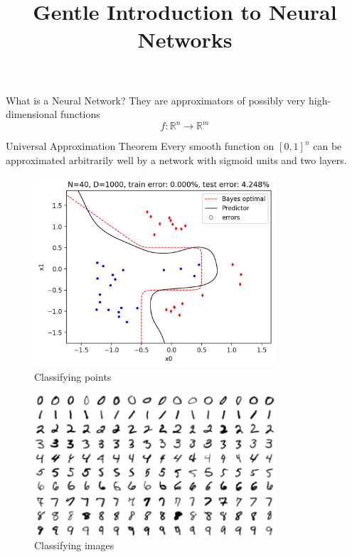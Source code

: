 \documentclass{beamer}
\title[Neural Networks]{Gentle Introduction to Neural Networks}
\institute{
    SWEHQ, General Assembly
}
\date{\displaydate{date}}
\begin{document}
\frame{\titlepage}

\begin{frame}{What is a Neural Network?}
    They are approximators of possibly very high-dimensional functions
    $$f: \mathbb{R}^n \rightarrow \mathbb{R}^m$$
    \begin{block}{Universal Approximation Theorem}
        Every smooth function on $\left[0, 1\right]^n$ can be approximated arbitrarily well by a network with sigmoid units and two layers.
    \end{block}
    \begin{minipage}[b]{0.45\textwidth}
        \begin{figure}
            \centering
            \includegraphics[width=0.8\textwidth]{./images/01_boundary.png}
            \caption*{Classifying points}
        \end{figure}
    \end{minipage}
    \hfill
    \begin{minipage}[b]{0.45\textwidth}
        \begin{figure}
            \centering
            \includegraphics[width=0.8\textwidth]{./images/01_mnist.png}
            \caption*{Classifying images}
        \end{figure}
    \end{minipage}
\end{frame}
\end{document}
